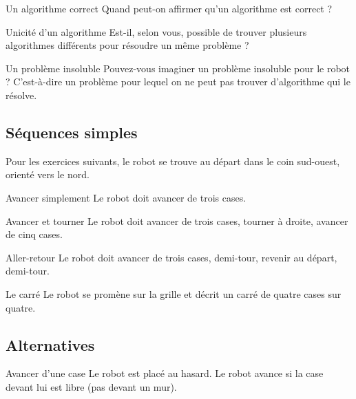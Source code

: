 \begin{Exercice}{Un algorithme correct}
Quand peut-on affirmer qu'un algorithme est correct ?
\end{Exercice}

\begin{Exercice}{Unicité d'un algorithme}
	Est-il, selon vous, possible de trouver 
	plusieurs algorithmes différents
	pour résoudre un même problème ?
\end{Exercice}

\begin{Exercice}{Un problème insoluble}
	Pouvez-vous imaginer un problème insoluble pour le robot ?
	C'est-à-dire un problème pour lequel on ne peut pas
	trouver d'algorithme qui le résolve.
\end{Exercice}

	\subsection{Séquences simples}
	
		Pour les exercices suivants, le robot se trouve 
		au départ dans le coin sud-ouest, 
		orienté vers le nord.

\begin{Exercice}{Avancer simplement}
	Le robot doit avancer de trois cases.
\end{Exercice}

\begin{Exercice}{Avancer et tourner}
	Le robot doit avancer de trois cases, tourner à droite, 
	avancer de cinq cases.
\end{Exercice}

\begin{Exercice}{Aller-retour}
	Le robot doit avancer de trois cases, demi-tour, 
	revenir au départ, demi-tour.
\end{Exercice}

\begin{Exercice}{Le carré}
	Le robot se promène sur la grille 
	et décrit un carré de quatre cases sur quatre.
\end{Exercice}
		
	\subsection{Alternatives}

\begin{Exercice}{Avancer d'une case}
	Le robot est placé au hasard.
	Le robot avance si la case devant lui est libre (pas devant un mur).
\end{Exercice}

